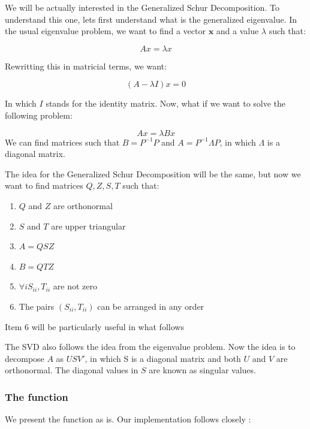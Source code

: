 \documentclass[12pt,a4paper]{article}
\begin{document}
We will be actually interested in the Generalized Schur Decomposition. To understand this one, lets first understand what is the generalized eigenvalue. In the usual eigenvalue problem, we want to find a vector $\mathbf{x}$ and a value $\lambda$ such that:

\[
Ax = \lambda x
\]

Rewritting this in matricial terms, we want:

\[
(A - \lambda I)x = 0
\]

In which $I$ stands for the identity matrix. Now, what if we want to solve the following problem:

\[
Ax = \lambda{}Bx
\]
We can find matrices such that $B = P^{-1}P$ and $A = P^{-1}\Lambda{}P$, in which $\Lambda$ is a diagonal matrix.

The idea for the Generalized Schur Decomposition will be the same, but now we want to find matrices $Q,Z,S,T$ such that:

\begin{enumerate}
\item $Q$ and $Z$ are orthonormal

\item $S$ and $T$ are upper triangular

\item $A = QSZ$

\item $B = QTZ$

\item $\forall i S_{ii}, T_{ii}$ are not zero

\item The pairs $(S_{ii}, T_{ii})$ can be arranged in any order

\end{enumerate}
Item 6 will be particularly useful in what follows

The SVD also follows the idea from the eigenvalue problem. Now the idea is to decompose $A$ as $USV'$, in which S is a diagonal matrix and both $U$ and $V$ are orthonormal. The diagonal values in $S$ are known as singular values.

\subsubsection{The function}

We present the function as is. Our implementation follows closely \cite{Miao2014}:
\end{document}
